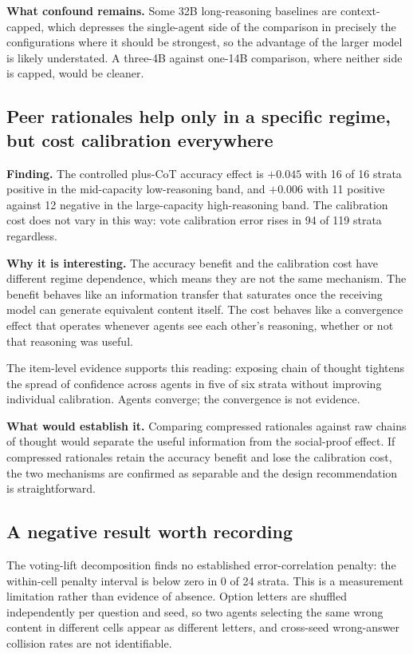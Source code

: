 \textbf{What confound remains.} Some 32B long-reasoning baselines are context-capped, which
depresses the single-agent side of the comparison in precisely the configurations where it
should be strongest, so the advantage of the larger model is likely understated. A three-4B
against one-14B comparison, where neither side is capped, would be cleaner.

\subsection{Peer rationales help only in a specific regime, but cost calibration everywhere}

\textbf{Finding.} The controlled plus-CoT accuracy effect is $+0.045$ with 16 of 16 strata
positive in the mid-capacity low-reasoning band, and $+0.006$ with 11 positive against 12
negative in the large-capacity high-reasoning band. The calibration cost does not vary in
this way: vote calibration error rises in 94 of 119 strata regardless.

\textbf{Why it is interesting.} The accuracy benefit and the calibration cost have different
regime dependence, which means they are not the same mechanism. The benefit behaves like an
information transfer that saturates once the receiving model can generate equivalent content
itself. The cost behaves like a convergence effect that operates whenever agents see each
other's reasoning, whether or not that reasoning was useful.

The item-level evidence supports this reading: exposing chain of thought tightens the spread
of confidence across agents in five of six strata without improving individual calibration.
Agents converge; the convergence is not evidence.

\textbf{What would establish it.} Comparing compressed rationales against raw chains of
thought would separate the useful information from the social-proof effect. If compressed
rationales retain the accuracy benefit and lose the calibration cost, the two mechanisms are
confirmed as separable and the design recommendation is straightforward.

\subsection{A negative result worth recording}

The voting-lift decomposition finds no established error-correlation penalty: the within-cell
penalty interval is below zero in 0 of 24 strata. This is a measurement limitation rather
than evidence of absence. Option letters are shuffled independently per question and seed,
so two agents selecting the same wrong content in different cells appear as different
letters, and cross-seed wrong-answer collision rates are not identifiable.

